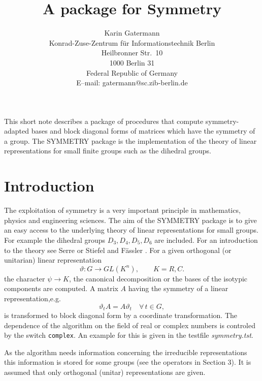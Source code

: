 \title{A \REDUCE{} package for Symmetry}
\date{}
\author{Karin Gatermann\\
        Konrad-Zuse-Zentrum f\"ur Informationstechnik Berlin\\
        Heilbronner Str.\ 10\\
        1000 Berlin 31\\
        Federal Republic of Germany\\
        E--mail: gatermann@sc.zib-berlin.de}

\maketitle
{}

This short note describes a package of \REDUCE{} procedures
that compute symmetry-adapted bases and block diagonal forms
of matrices which have the symmetry of a group.
The SYMMETRY package is the implementation
of the theory of linear representations
for small finite groups such as the dihedral groups.

\section{Introduction}

The exploitation of symmetry is a very important principle in mathematics,
physics and engineering sciences.
The aim of the SYMMETRY package is to give an easy access to the
underlying theory of linear representations for small groups. For
example the
dihedral groups $D_3,D_4,D_5,D_6$ are included.
For an introduction to the theory see {\sc Serre} \cite{Se77} or
{\sc Stiefel} and {\sc F\"assler} \cite{StFae79}.
For a given orthogonal (or unitarian) linear representation
\[
\vartheta : G\longrightarrow GL(K^n), \qquad K=R,C.
\]
the character $\psi\rightarrow K$, the
canonical decomposition or the bases of the isotypic
components are computed. A matrix $A$ having the symmetry of a linear
representation,e.g.
\[
\vartheta_t A = A \vartheta_t \quad \forall \, t\in G,
\]
is transformed to block diagonal form by a coordinate
transformation.
The dependence of the algorithm on the
field of real or complex numbers is controled by the switch {\tt complex}.
An example for this is given in the testfile {\em symmetry.tst}.

As the algorithm needs information concerning the irreducible representations
this information is stored for some groups (see the operators in Section 3).
It is assumed that only orthogonal (unitar) representations are given.


